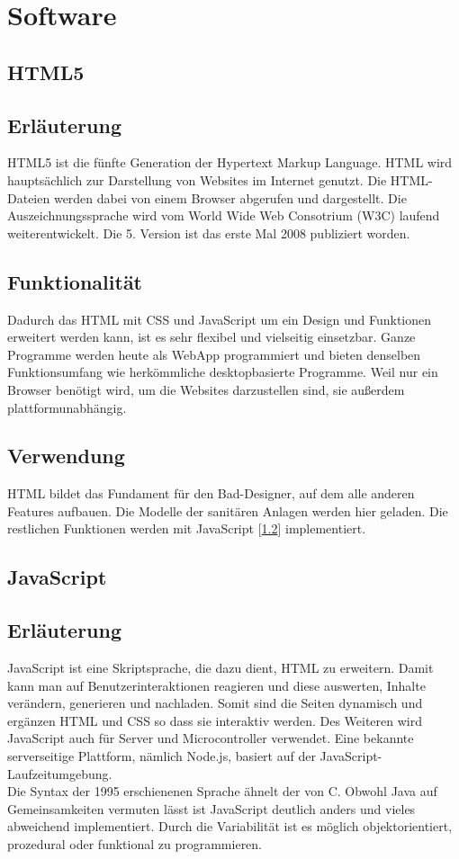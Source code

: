 \chapter{Software}

\section{HTML5}
\cite{w3schools_html}
\section*{Erläuterung}
HTML5 ist die fünfte Generation der Hypertext Markup Language. HTML wird hauptsächlich zur Darstellung von Websites im Internet genutzt. Die HTML-Dateien werden dabei von einem Browser abgerufen und dargestellt. Die Auszeichnungssprache wird vom World Wide Web Consotrium (W3C) laufend weiterentwickelt. Die 5. Version ist das erste Mal 2008 publiziert worden.

\section*{Funktionalität}
Dadurch das HTML mit CSS und JavaScript um ein Design und Funktionen erweitert werden kann, ist es sehr flexibel und vielseitig einsetzbar. Ganze Programme werden heute als WebApp programmiert und bieten denselben Funktionsumfang wie herkömmliche desktopbasierte Programme. Weil nur ein Browser benötigt wird, um die Websites darzustellen sind, sie außerdem plattformunabhängig.


\section*{Verwendung}
HTML bildet das Fundament für den Bad-Designer, auf dem alle anderen Features aufbauen. Die Modelle der sanitären Anlagen werden hier geladen. Die restlichen Funktionen werden mit JavaScript [\ref{sec:JavaScript}] implementiert.

\newpage
\clearpage

\section{JavaScript}\label{sec:JavaScript}
\cite{wiki_js}


\section*{Erläuterung}
JavaScript ist eine Skriptsprache, die dazu dient, HTML zu erweitern. Damit kann man auf Benutzerinteraktionen reagieren und diese auswerten, Inhalte verändern, generieren und nachladen. Somit sind die Seiten dynamisch und ergänzen HTML und CSS so dass sie interaktiv werden. Des Weiteren wird JavaScript auch für Server und Microcontroller verwendet. Eine bekannte serverseitige Plattform, nämlich Node.js, basiert auf der JavaScript-Laufzeitumgebung. 
\\
Die Syntax der 1995 erschienenen Sprache ähnelt der von C. Obwohl Java auf Gemeinsamkeiten vermuten lässt ist JavaScript deutlich anders und vieles abweichend implementiert. Durch die Variabilität ist es möglich objektorientiert, prozedural oder funktional zu programmieren.

